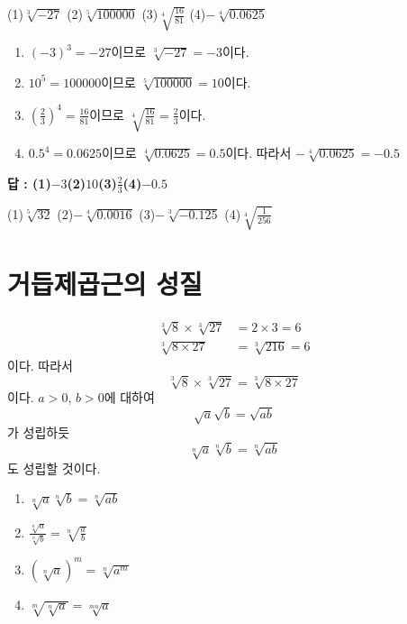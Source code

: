 \documentclass{oblivoir}
\begin{document}
%
\label{nthroot18}
\par\noindent
(1)\:\:\(\sqrt[3]{-27}\)
(2)\:\:\(\sqrt[5]{100000}\)
(3)\:\:\(\sqrt[4]{\frac{16}{81}}\)
(4)\:\:\(-\sqrt[4]{0.0625}\)
\begin{mdframed}
\begin{enumerate}
\item
\((-3)^3=-27\)이므로 \(\sqrt[3]{-27}=-3\)이다.
\item
\(10^5=100000\)이므로 \(\sqrt[5]{100000}=10\)이다.
\item
\(\left(\frac23\right)^4=\frac{16}{81}\)이므로 \(\sqrt[4]{\frac{16}{81}}=\frac23\)이다.
\item
\(0.5^4=0.0625\)이므로 \(\sqrt[4]{0.0625}=0.5\)이다.
따라서 \(-\sqrt[4]{0.0625}=-0.5\)
\end{enumerate}
\end{mdframed}
{\par\raggedleft\textbf{답 :
(1)\:\:\(-3\)\quad(2)\:\:\(10\)\:\:(3)\:\:\(\frac23\)\quad(4)\:\:\(-0.5\)}\par}\bigskip

%
\label{nthroot19}
\par\noindent
(1)\:\:\(\sqrt[5]{32}\)
(2)\:\:\(-\sqrt[4]{0.0016}\)
(3)\:\:\(-\sqrt[3]{-0.125}\)
(4)\:\:\(\sqrt[4]{\frac1{256}}\)

\section{거듭제곱근의 성질}
%
\label{property1}
\vspace{-20pt}
\begin{align*}
\sqrt[3]8\times\sqrt[3]{27}&=2\times3=6\\
\sqrt[3]{8\times27}&=\sqrt[3]{216}=6
\end{align*}
이다.
따라서
\vspace{-5pt}
\[\sqrt[3]8\times\sqrt[3]{27}=\sqrt[3]{8\times27}\]
이다.
\(a>0\), \(b>0\)에 대하여
\vspace{-5pt}
\[\sqrt a\sqrt b=\sqrt{ab}\]
가 성립하듯
\vspace{-5pt}
\[\sqrt[n]a\sqrt[n]b=\sqrt[n]{ab}\]
도 성립할 것이다.

%
\begin{mdframed}
\begin{enumerate}[label=(\alph*)]\label{property2}
\item
\(\displaystyle\sqrt[n]a\sqrt[n]b=\sqrt[n]{ab}\)
\item
\(\displaystyle\frac{\sqrt[n]a}{\sqrt[n]b}=\sqrt[n]{\frac ab}\)
\item
\(\displaystyle(\sqrt[n]a)^m=\sqrt[n]{a^m}\)
\item
\(\displaystyle\sqrt[m]{\sqrt[n]a}=\sqrt[mn]{a}\)
\end{enumerate}
\end{mdframed}
\end{document}

